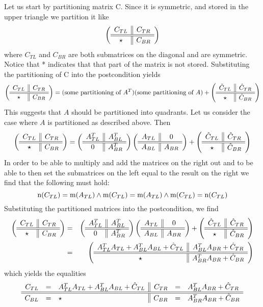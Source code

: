 \[
\]
Let us start by partitioning matrix C.  Since it is symmetric, and stored in the upper
triangle we partition it like
\[
\left( \begin{array}{c || c}  C_{TL}  &  C_{TR}  \\ \hline \hline  \star  &  C_{BR}  \end{array} \right)
\]
where $ C_{TL} $  and $ C_{BR} $ are both submatrices on the diagonal and are symmetric.
Notice that * indicates that that part of the matrix is not stored.
Substituting the partitioning of C into the postcondition yields
\[
\left( \begin{array}{c || c}  C_{TL}  &  C_{TR}  \\ \hline \hline  \star  &  C_{BR}  \end{array} \right)
=
( \mbox{some partitioning of }{A^T} )
( \mbox{some partitioning of }{A} )
+
\left( \begin{array}{c || c}  \hat{C}_{TL}  &  \hat{C}_{TR}  \\ \hline \hline  \star  &  \hat{C}_{BR}  \end{array} \right)
\]
This suggests that $ A $ should be partitioned
into quadrants.  Let us consider
the case where $ A $ is partitioned as described above.  Then
\[
\left( \begin{array}{c || c}  C_{TL}  &  C_{TR}  \\ \hline \hline  \star &  C_{BR}  \end{array} \right)
=
\left( \begin{array}{c || c}  A_{TL}^T  &  A_{BL}^T  \\ \hline \hline  0  &  A_{BR}^T  \end{array} \right)
\left( \begin{array}{c || c}  A_{TL}  &  0  \\ \hline \hline  A_{BL}  &  A_{BR}  \end{array} \right)
+
\left( \begin{array}{c || c}  \hat{C}_{TL}  &  \hat{C}_{TR}  \\ \hline \hline  \star  &  \hat{C}_{BR}  \end{array} \right)
\]
In order to be able to multiply and add the matrices on the right out and to
be able to then set the submatrices on the left equal to the result on
the right we find that the following must hold:
\[
\mbox{n}( C_{TL} ) = \mbox{m}( A_{TL} )
\wedge
\mbox{m}( C_{TL} ) = \mbox{m}( A_{TL} )
\wedge
\mbox{m}( C_{TL} ) = \mbox{n}( C_{TL} )
\]
Substituting the partitioned matrices into the postcondition, we find
\begin{eqnarray*}
 \left( \begin{array}{c || c}  C_{TL}  &  C_{TR}  \\ \hline \hline  \star &  C_{BR}  \end{array} \right)
& = &
\left( \begin{array}{c || c}  A_{TL}^T  &  A_{BL}^T  \\ \hline \hline  0  &  A_{BR}^T  \end{array} \right)
\left( \begin{array}{c || c}  A_{TL}  &  0  \\ \hline \hline  A_{BL}  &  A_{BR}  \end{array} \right)
+
\left( \begin{array}{c || c}  \hat{C}_{TL}  &  \hat{C}_{TR}  \\ \hline \hline  \star  &  \hat{C}_{BR}  \end{array} \right)
\\ & = &
\left( \begin{array}{c || c}  A_{TL}^T A_{TL} + A_{BL}^T A_{BL} + \hat{C}_{TL}  &  A_{BL}^T A_{BR} + \hat{C}_{TR} \\ \hline \hline \star & A_{BR}^T A_{BR} + \hat{C}_{BR} \end{array} \right)
\end{eqnarray*}
which yields the equalities
\begin{equation}
\label{eqn:sytrrk_uln}
\begin{array}{r c l || r c l}
C_{TL} &=& A_{TL}^T A_{TL} + A_{BL}^T A_{BL} + \hat{C}_{TL} & C_{TR} &=& A_{BL}^T A_{BR} + \hat{C}_{TR} \\ \hline \hline
C_{BL} &=& \star & C_{BR} &=&  A_{BR}^T A_{BR} + \hat{C}_{BR}


\end{array}
\end{equation}


